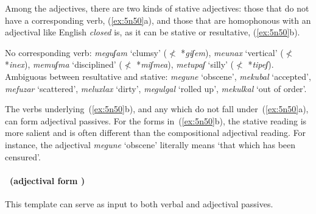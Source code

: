 \begin{exe}
\begin{xlist}
\begin{exe}
\begin{xlist}
\begin{exe}
\begin{exe}
\begin{xlist}
\begin{exe}
\begin{exe}
\begin{xlist}
\begin{exe}
\begin{xlist}
\begin{exe}
\begin{xlist}
\begin{exe}
\begin{xlist}
\begin{xlist}
\begin{exe}
\begin{xlist}
\begin{exe}
\begin{xlist}
\begin{exe}
\begin{exe}
\begin{exe}
\begin{xlist}
\begin{exe}
\begin{exe}
\begin{xlist}
\begin{exe}
\begin{xlist}
\begin{exe}
\begin{xlist}
\begin{exe}
\begin{xlist}
\begin{xlist}
\begin{exe}
\begin{xlist}
\begin{exe}
\begin{xlist}
\begin{exe}
\begin{xlist}
\begin{exe}
\begin{xlist}
\begin{exe}
\begin{exe}
\begin{exe}
\begin{exe}
\begin{exe}
\begin{xlist}
\begin{xlist}
\begin{exe}
\begin{xlist}
\begin{exe}
\begin{xlist}
\begin{exe}
\begin{exe}
\begin{exe}
\begin{xlist}
Among the adjectives, there are two kinds of stative adjectives: those that do not have a corresponding verb, (\ref{ex:5n50}a), and those that are homophonous with an adjectival  like English \emph{closed} is, as it can be stative or resultative, (\ref{ex:5n50}b).
 \begin{exe}
 \ex  \label{ex:5n50}
 \begin{xlist} 
   \ex  No corresponding verb: \emph{meguʃam} `clumsy' ($\nless$ *\emph{giʃem}), \emph{meunax} `vertical' ($\nless$ *\emph{inex}), \emph{memuʃma} `disciplined' ($\nless$ *\emph{miʃmea}), \emph{metupaʃ} `silly' ($\nless$ *\emph{tipeʃ}). 
   \ex  Ambiguous between resultative and stative: \emph{megune} `obscene', \emph{mekubal} `accepted', \emph{mefuzar} `scattered', \emph{meluxlax} `dirty', \emph{megulgal} `rolled up', \emph{mekulkal} `out of order'.  
 \z
\z 


The verbs underlying~(\ref{ex:5n50}b), and any which do not fall under~(\ref{ex:5n50}a), can form adjectival passives. For the forms in~(\ref{ex:5n50}b), the stative reading is more salient and is often different than the compositional adjectival  reading. For instance, the adjectival  \emph{megune} `obscene' literally means `that which has been censured'.

\paragraph*{\thif~(adjectival form \mhuf)}
This template can serve as input to both verbal and adjectival passives.


\end{xlist}
\end{exe}
\end{xlist}
\end{exe}
\end{exe}
\end{exe}
\end{xlist}
\end{exe}
\end{xlist}
\end{exe}
\end{xlist}
\end{xlist}
\end{exe}
\end{exe}
\end{exe}
\end{exe}
\end{exe}
\end{xlist}
\end{exe}
\end{xlist}
\end{exe}
\end{xlist}
\end{exe}
\end{xlist}
\end{exe}
\end{xlist}
\end{xlist}
\end{exe}
\end{xlist}
\end{exe}
\end{xlist}
\end{exe}
\end{xlist}
\end{exe}
\end{exe}
\end{xlist}
\end{exe}
\end{exe}
\end{exe}
\end{xlist}
\end{exe}
\end{xlist}
\end{exe}
\end{xlist}
\end{xlist}
\end{exe}
\end{xlist}
\end{exe}
\end{xlist}
\end{exe}
\end{xlist}
\end{exe}
\end{exe}
\end{xlist}
\end{exe}
\end{exe}
\end{xlist}
\end{exe}
\end{xlist}
\end{exe}
